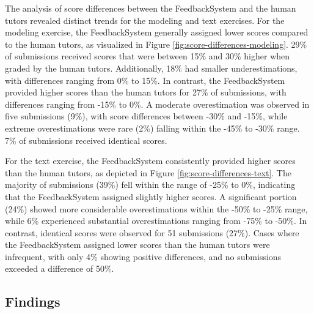 \documentclass[sigconf,screen,review,anonymous]{acmart}
\begin{document}
The analysis of score differences between the FeedbackSystem and the human tutors revealed distinct trends for the modeling and text exercises.
For the modeling exercise, the FeedbackSystem generally assigned lower scores compared to the human tutors, as visualized in Figure \ref{fig:score-differences-modeling}.
29\% of submissions received scores that were between 15\% and 30\% higher when graded by the human tutors.
Additionally, 18\% had smaller underestimations, with differences ranging from 0\% to 15\%.
In contrast, the FeedbackSystem provided higher scores than the human tutors for 27\% of submissions, with differences ranging from -15\% to 0\%.
A moderate overestimation was observed in five submissions (9\%), with score differences between -30\% and -15\%, while extreme overestimations were rare (2\%) falling within the -45\% to -30\% range.
7\% of submissions received identical scores.

For the text exercise, the FeedbackSystem consistently provided higher scores than the human tutors, as depicted in Figure \ref{fig:score-differences-text}.
The majority of submissions (39\%) fell within the range of -25\% to 0\%, indicating that the FeedbackSystem assigned slightly higher scores.
A significant portion (24\%) showed more considerable overestimations within the -50\% to -25\% range, while 6\% experienced substantial overestimations ranging from -75\% to -50\%.
In contrast, identical scores were observed for 51 submissions (27\%).
Cases where the FeedbackSystem assigned lower scores than the human tutors were infrequent, with only 4\% showing positive differences, and no submissions exceeded a difference of 50\%.

\subsection{Findings}


\end{document}
